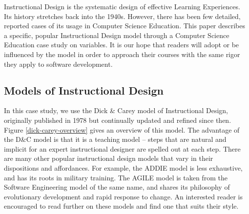 \documentclass{sig-alternate}
\begin{document}
Instructional Design is the systematic design of effective Learning Experiences. 
Its history stretches back into the 1940s. However, there has been few detailed, reported cases of its usage in Computer Science Education.
This paper describes a specific, popular Instructional Design model through a Computer Science Education case study on variables.
It is our hope that readers will adopt or be influenced by the model in order to approach their courses with the same rigor they apply to software development.

\subsection{Models of Instructional Design}

In this case study, we use the Dick \& Carey model of Instructional Design, originally published in 1978 but continually updated and refined since then.
Figure \ref{dick-carey-overview} gives an overview of this model.
The advantage of the D\&C model is that it is a teaching model -- steps that are natural and implicit for an expert instructional designer are spelled out at each step.
There are many other popular instructional design models that vary in their dispositions and affordances.
For example, the ADDIE model is less exhaustive, and has its roots in military training. 
The AGILE model is taken from the Software Engineering model of the same name, and shares its philosophy of evolutionary development and rapid response to change.
An interested reader is encouraged to read further on these models and find one that suits their style.
\end{document}
